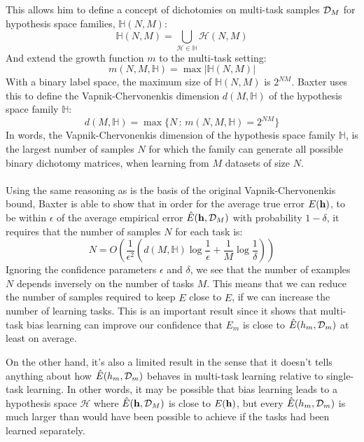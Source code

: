 This allows him to define a concept of dichotomies on multi-task samples $\mathcal{D}_M$ for hypothesis space families, $\mathbb{H}(N, M)$:
$$
\mathbb{H}(N, M) = \bigcup\limits_{\mathcal{H} \in \mathbb{H}} \mathcal{H}(N, M)
$$
And extend the growth function $m$ to the multi-task setting:
$$
m(N, M, \mathbb{H}) = \max|\mathbb{H}(N, M)|
$$
With a binary label space, the maximum size of $\mathbb{H}(N, M)$ is $2^{NM}$. Baxter uses this to define the Vapnik-Chervonenkis dimension $d(M, \mathbb{H})$ of the hypothesis space family $\mathbb{H}$:
$$
d(M, \mathbb{H}) = \max\{N\, : \, m(N, M, \mathbb{H}) = 2^{NM}\}
$$
In words, the Vapnik-Chervonenkis dimension of the hypothesis space family $\mathbb{H}$, is the largest number of samples $N$ for which the family can generate all possible binary dichotomy matrices, when learning from $M$ datasets of size $N$.
\\\\
Using the same reasoning as is the basis of the original Vapnik-Chervonenkis bound, Baxter is able to show that in order for the average true error $E(\mathbf{h})$, to be within $\epsilon$ of the average empirical error $\hat{E}(\mathbf{h}, \mathcal{D}_M)$ with probability $1 - \delta$, it requires that the number of samples $N$ for each task is:
$$
N = O\left(\frac{1}{\epsilon^2}\left(d(M, \mathbb{H}) \log \frac{1}{\epsilon} + \frac{1}{M} \log \frac{1}{\delta}\right)\right)
$$
Ignoring the confidence parameters $\epsilon$ and $\delta$, we see that the number of examples $N$ depends inversely on the number of tasks $M$. This means that we can reduce the number of samples required to keep $E$ close to $\hat{E}$, if we can increase the number of learning tasks. This is an important result since it shows that multi-task bias learning can improve our confidence that $E_m$ is close to $\hat{E}(h_m, \mathcal{D}_m)$ at least on average. 

On the other hand, it's also a limited result in the sense that it doesn't tells anything about how $\hat{E}(h_m, \mathcal{D}_m)$ behaves in multi-task learning relative to single-task learning. In other words, it may be possible that bias learning leads to a hypothesis space $\mathcal{H}$ where $\hat{E}(\mathbf{h}, \mathcal{D}_M)$ is close to $E(\mathbf{h})$, but every $\hat{E}(h_m, \mathcal{D}_m)$ is much larger than would have been possible to achieve if the tasks had been learned separately.